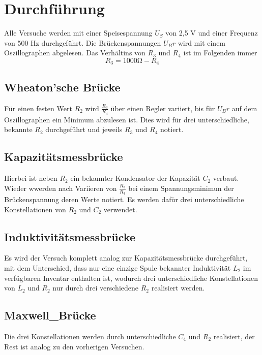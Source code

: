\section{Durchführung}
\label{sec:Durchführung}

Alle Versuche werden mit einer Speisespannung $U_S$ von 2,5 \si{\volt} und einer Frequenz von 500 \si{\hertz}
durchgeführt. Die Brückenspannungen $U_Br$ wird mit einem Oszillographen abgelesen. Das Verhältins von 
$R_3$ und $R_4$ ist im Folgenden immer \begin{equation}
    R_3 = 1000\si{\ohm} - R_4
\end{equation}

\subsection{Wheaton'sche Brücke}

Für einen festen Wert $R_2$ wird $\frac{R_3}{R_4}$ über einen Regler variiert, bis für $U_Br$ auf dem 
Oszillographen ein Minimum abzulesen ist. Dies wird für drei unterschiedliche, bekannte $R_2$ 
durchgeführt und jeweils $R_3$ und $R_4$ notiert. 

\subsection{Kapazitätsmessbrücke}

Hierbei ist neben $R_2$ ein bekannter Kondensator der Kapazität $C_2$ verbaut. 
Wieder wwerden nach Variieren von $\frac{R_3}{R_4}$ bei einem Spannungsminimun der
Brückenspannung deren Werte notiert. Es werden dafür drei unterschiedliche Konstellationen
von $R_2$ und $C_2$ verwendet. 

\subsection{Induktivitätsmessbrücke}

Es wird der Versuch komplett analog zur Kapazitätsmessbrücke durchgeführt, mit dem Unterschied, 
dass nur eine einzige Spule bekannter Induktivität $L_2$ im verfügbaren Inventar enthalten ist,
wodurch drei unterschiedliche Konstellationen von $L_2$ und $R_2$ nur durch drei verschiedene 
$R_2$ realisiert werden.

\subsection{Maxwell_Brücke}

Die drei Konstellationen werden durch unterschiedliche $C_4$ und $R_2$ realisiert, der Rest ist 
analog zu den vorherigen Versuchen.

